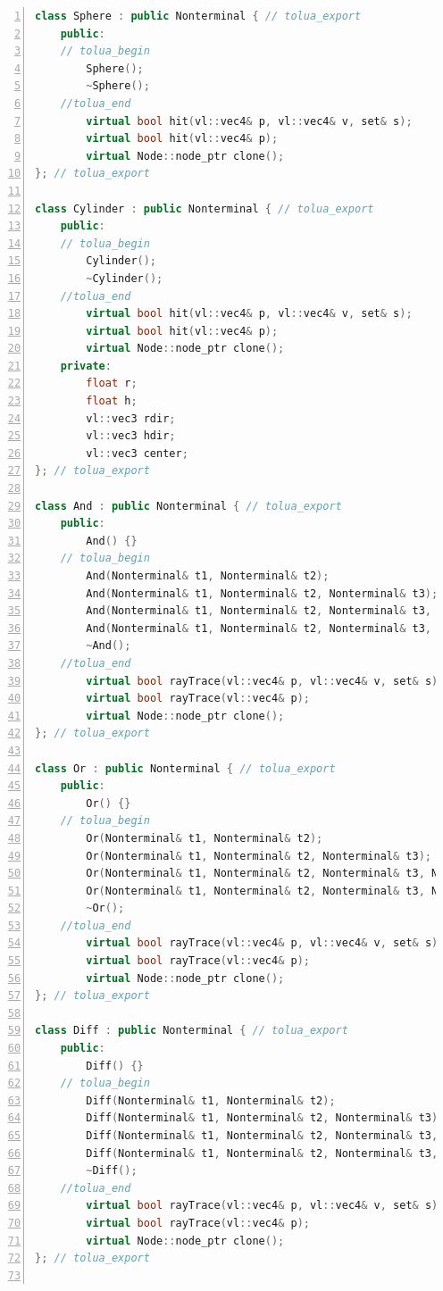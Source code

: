 {
\small
\begin{lstlisting}[language=C++,numbers=left,frame=single,numberstyle=\tiny,backgroundcolor=\color{code_back},breaklines=true]
class Sphere : public Nonterminal { // tolua_export
    public:
    // tolua_begin
        Sphere();
        ~Sphere();
    //tolua_end
        virtual bool hit(vl::vec4& p, vl::vec4& v, set& s);
        virtual bool hit(vl::vec4& p);
        virtual Node::node_ptr clone();
}; // tolua_export

class Cylinder : public Nonterminal { // tolua_export
    public:
    // tolua_begin
        Cylinder();
        ~Cylinder();
    //tolua_end
        virtual bool hit(vl::vec4& p, vl::vec4& v, set& s);
        virtual bool hit(vl::vec4& p);
        virtual Node::node_ptr clone();
    private:
        float r;
        float h;
        vl::vec3 rdir;
        vl::vec3 hdir;
        vl::vec3 center;
}; // tolua_export

class And : public Nonterminal { // tolua_export
    public:
        And() {}
    // tolua_begin
        And(Nonterminal& t1, Nonterminal& t2);
        And(Nonterminal& t1, Nonterminal& t2, Nonterminal& t3);
        And(Nonterminal& t1, Nonterminal& t2, Nonterminal& t3, Nonterminal& t4);
        And(Nonterminal& t1, Nonterminal& t2, Nonterminal& t3, Nonterminal& t4, Nonterminal& t5);
        ~And();
    //tolua_end
        virtual bool rayTrace(vl::vec4& p, vl::vec4& v, set& s);
        virtual bool rayTrace(vl::vec4& p);
        virtual Node::node_ptr clone();
}; // tolua_export

class Or : public Nonterminal { // tolua_export
    public:
        Or() {}
    // tolua_begin
        Or(Nonterminal& t1, Nonterminal& t2);
        Or(Nonterminal& t1, Nonterminal& t2, Nonterminal& t3);
        Or(Nonterminal& t1, Nonterminal& t2, Nonterminal& t3, Nonterminal& t4);
        Or(Nonterminal& t1, Nonterminal& t2, Nonterminal& t3, Nonterminal& t4, Nonterminal& t5);
        ~Or();
    //tolua_end
        virtual bool rayTrace(vl::vec4& p, vl::vec4& v, set& s);
        virtual bool rayTrace(vl::vec4& p);
        virtual Node::node_ptr clone();
}; // tolua_export

class Diff : public Nonterminal { // tolua_export
    public:
        Diff() {}
    // tolua_begin
        Diff(Nonterminal& t1, Nonterminal& t2);
        Diff(Nonterminal& t1, Nonterminal& t2, Nonterminal& t3);
        Diff(Nonterminal& t1, Nonterminal& t2, Nonterminal& t3, Nonterminal& t4);
        Diff(Nonterminal& t1, Nonterminal& t2, Nonterminal& t3, Nonterminal& t4, Nonterminal& t5);
        ~Diff();
    //tolua_end
        virtual bool rayTrace(vl::vec4& p, vl::vec4& v, set& s);
        virtual bool rayTrace(vl::vec4& p);
        virtual Node::node_ptr clone();
}; // tolua_export


\end{lstlisting}}
